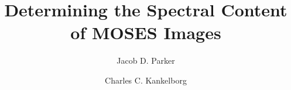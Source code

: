 \documentclass[linenumbers]{aastex63}
\begin{document}
	
	\title{Determining the Spectral Content of MOSES Images}
	
	\author[0000-0001-8732-8284]{Jacob D. Parker}
	\author[0000-0002-1992-7469]{Charles C. Kankelborg}
	

	\begin{abstract}
		
	\end{abstract}
    
    \acknowledgements
    
	
	
\end{document}
